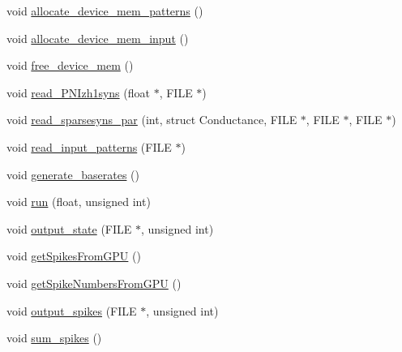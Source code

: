 \begin{DoxyCompactItemize}
\item 
void \hyperlink{classclassol_a224bf755bd74d7512606518ae2658215}{allocate\+\_\+device\+\_\+mem\+\_\+patterns} ()
\item 
void \hyperlink{classclassol_aec30118b75a92ebca10eb227345cddfe}{allocate\+\_\+device\+\_\+mem\+\_\+input} ()
\item 
void \hyperlink{classclassol_ade653847f5de20fe2f944260d532ddf9}{free\+\_\+device\+\_\+mem} ()
\item 
void \hyperlink{classclassol_a65f0ad084c38a82cde6cffcaf70aea0a}{read\+\_\+\+P\+N\+Izh1syns} (float $\ast$, F\+I\+L\+E $\ast$)
\item 
void \hyperlink{classclassol_a8f2e2c575501aa0bb2c5864adccd6aac}{read\+\_\+sparsesyns\+\_\+par} (int, struct Conductance, F\+I\+L\+E $\ast$, F\+I\+L\+E $\ast$, F\+I\+L\+E $\ast$)
\item 
void \hyperlink{classclassol_a554e027fafa47fbf9ee68e9e5bd91de2}{read\+\_\+input\+\_\+patterns} (F\+I\+L\+E $\ast$)
\item 
void \hyperlink{classclassol_a4e4e5bee0655e84dfee6e98e6a75dc3b}{generate\+\_\+baserates} ()
\item 
void \hyperlink{classclassol_ae907498a8660fe41f7d9b41aad6e5d10}{run} (float, unsigned int)
\item 
void \hyperlink{classclassol_a88179d17f4ea568b7b58a329a741eb53}{output\+\_\+state} (F\+I\+L\+E $\ast$, unsigned int)
\item 
void \hyperlink{classclassol_ae571e028c069103e19bb4975bdb0dd47}{get\+Spikes\+From\+G\+P\+U} ()
\item 
void \hyperlink{classclassol_a08d82fc16288158062aef866a1e29a65}{get\+Spike\+Numbers\+From\+G\+P\+U} ()
\item 
void \hyperlink{classclassol_a54d61e7df53d16d7b8e1de46bcca6c6c}{output\+\_\+spikes} (F\+I\+L\+E $\ast$, unsigned int)
\item 
void \hyperlink{classclassol_af9dfaa92f0e4737dbadd9ec9cd203555}{sum\+\_\+spikes} ()
\end{DoxyCompactItemize}
